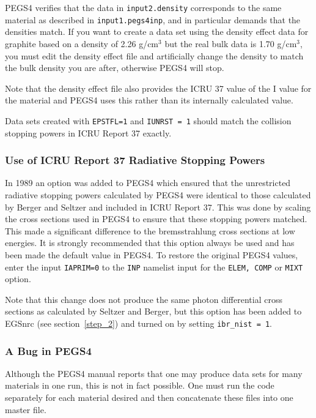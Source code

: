 PEGS4 verifies that the data in {\tt input2.density} corresponds to the same
material as described in {\tt input1.pegs4inp}, and in particular demands
that the densities match.  If you want to create a data set using the
density effect data for graphite based on a density of 2.26 g/cm$^3$ but
the real bulk data is 1.70 g/cm$^3$, you must edit the density effect file
and artificially change the density to match the bulk density you are
after, otherwise PEGS4 will stop.

Note that the density effect file also provides the ICRU 37 value of the I
value for the material and PEGS4 uses this rather than its internally
calculated value.

Data sets created with {\tt EPSTFL=1} and {\tt IUNRST = 1} should match the
collision stopping powers in ICRU Report 37 exactly.

\subsubsection{Use of ICRU Report 37 Radiative Stopping Powers}
In 1989 an option was added to PEGS4\cite{Ro89a} which ensured that
the unrestricted radiative stopping powers calculated by PEGS4 were
identical to those calculated by Berger and Seltzer\cite{BS83} and
included in ICRU Report 37\cite{ICRU37}.  This was done by scaling the
cross sections used in PEGS4 to ensure that these stopping powers matched.
This made a significant difference to the bremsstrahlung cross sections
at low energies.  It is strongly recommended that this option always
be used and has been made the default value in PEGS4. To restore the
original PEGS4 values, enter  the input {\tt IAPRIM=0}
to the {\tt INP} namelist input for the {\tt ELEM, COMP} or {\tt MIXT}
option.


Note that this change does not produce the same photon differential cross
sections as calculated by Seltzer and Berger\cite{SB85}, but this option
has been added to EGSnrc (see section~\ref{step_2}) and turned on by
setting {\tt ibr\_nist = 1}.



\subsubsection{A Bug in PEGS4}
Although the PEGS4 manual reports that one may produce data sets for many
materials in one run, this is not in fact possible.  One must run the code
separately for each material desired and then concatenate these files into
one master file.


